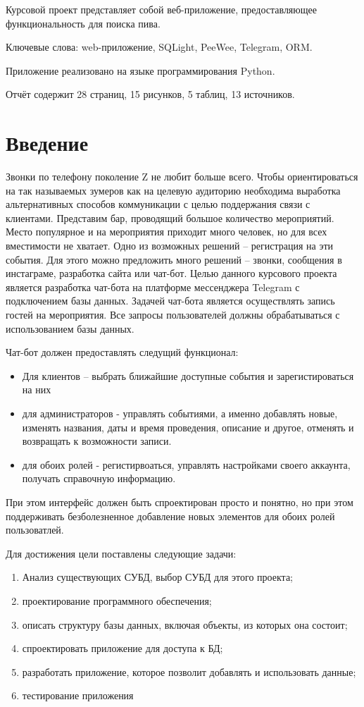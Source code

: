 \documentclass[12pt,a4paper,oneside]{report}
\begin{document}
\quad Курсовой проект представляет собой веб-приложение, предоставляющее функциональность для поиска пива.

Ключевые слова: web-приложение, SQLight, PeeWee, Telegram, ORM.

Приложение реализовано на языке программирования Python.

Отчёт содержит 28 страниц, 15 рисунков, 5 таблиц, 13 источников.

\clearpage
\renewcommand*\contentsname{Содержание}
\tableofcontents
\setcounter{page}{4}
\newpage

\chapter*{Введение}
\quad Звонки по телефону поколение Z не любит больше всего. Чтобы ориентироваться на так называемых зумеров как на целевую аудиторию необходима выработка альтернативных способов коммуникации с целью поддержания связи с клиентами. Представим бар, проводящий большое количество мероприятий. Место популярное и на мероприятия приходит много человек, но для всех вместимости не хватает. Одно из возможных решений – регистрация на эти события. Для этого можно предложить много решений – звонки, сообщения в инстаграме, разработка сайта или чат-бот. Целью данного курсового проекта является разработка чат-бота на платформе мессенджера Telegram с подключением базы данных. Задачей чат-бота является осуществлять запись гостей на мероприятия. Все запросы пользователей должны обрабатываться с использованием базы данных.

Чат-бот должен предоставлять следущий функционал:
\begin{itemize}
    \item Для клиентов – выбрать ближайшие доступные события и зарегистироваться на них
    \item для администраторов - управлять событиями, а именно добавлять новые, изменять названия, даты и время проведения, описание и другое, отменять и возвращать к возможности записи.
    \item для обоих ролей - регистирвоаться, управлять настройками своего аккаунта, получать справочную информацию.
\end{itemize}

При этом интерфейс должен быть спроектирован просто и понятно, но при этом поддерживать безболезненное добавление новых элементов для обоих ролей пользоватлей.

Для достижения цели поставлены следующие задачи:
\begin{enumerate}
    \item Анализ существующих СУБД, выбор СУБД для этого проекта;
    \item проектирование программного обеспечения;
    \item описать структуру базы данных, включая объекты, из которых она состоит;
    \item спроектировать приложение для доступа к БД;
    \item разработать приложение, которое позволит добавлять и использовать данные;
    \item тестирование приложения
\end{enumerate}
\end{document}
